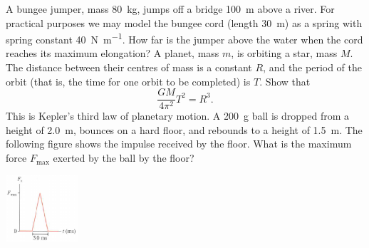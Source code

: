 \documentclass[a4paper]{exam}
\begin{document}
\begin{questions}
    \question A bungee jumper, mass \SI{80}{\kilo\gram}, jumps off a bridge \SI{100}{\metre} above a river. For practical purposes we may model
              the bungee cord (length \SI{30}{\metre}) as a spring with spring constant \SI{40}{\newton\per\metre}. How far is the jumper above
              the water when the cord reaches its maximum elongation?
    \question A planet, mass $ m $, is orbiting a star, mass $ M $. The distance between their centres of mass is a constant $ R $, and the period
              of the orbit (that is, the time for one orbit to be completed) is $ T $. Show that
              \begin{displaymath}
                \frac{GM}{4\pi^2} T^2 = R^3.
              \end{displaymath}
              This is Kepler's third law of planetary motion.
    \question A \SI{200}{\gram} ball is dropped from a height of \SI{2.0}{\metre}, bounces on a hard floor, and rebounds to a height of \SI{1.5}{\metre}.
              The following figure shows the impulse received by the floor. What is the maximum force $ F_\text{max} $ exerted by the ball by the floor?

              \includegraphics[width=0.2\textwidth]{impulse_curve}
    \question
\end{questions}
\end{document}

